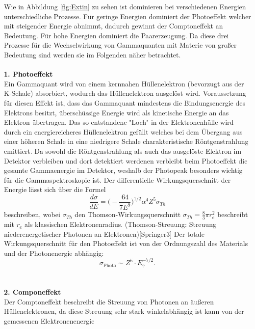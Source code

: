 Wie in Abbildung \ref{fig:Extin} zu sehen ist dominieren bei verschiedenen Energien
unterschiedliche Prozesse. Für geringe Energien dominiert der Photoeffekt welcher mit
steigender Energie abnimmt, dadurch gewinnt der Comptoneffekt an Bedeutung. Für hohe
Energien dominiert die Paarerzeugung.
Da diese drei Prozesse für die Wechselwirkung von Gammaquanten mit Materie von großer Bedeutung sind
werden sie im Folgenden näher betrachtet.
\cite{Springer3}
\\
\\
\textbf{1. Photoeffekt}\\
Ein Gammaquant wird von einem kernnahen Hüllenelektron (bevorzugt aus der K-Schale) absorbiert,
wodurch das Hüllenelektron ausgelöst wird. Voraussetzung für diesen Effekt ist, dass das Gammaquant
mindestens die Bindungsenergie des Elektrons besitzt, überschüssige Energie wird als kinetische
Energie an das Elektron übertragen.
Das so entstandene "Loch" in der Elektronenhülle wird durch ein energiereicheres Hüllenelektron
gefüllt welches bei dem Übergang aus einer höheren Schale in eine niedrigere Schale
charakteristische Röntgenstrahlung emittiert.
Da sowohl die Röntgenstrahlung als auch das ausgelöste Elektron im Detektor verbleiben und
dort detektiert werdenen verbleibt beim Photoeffekt die gesamte Gammaenergie im Detektor, weshalb
der Photopeak besonders wichtig für die Gammaspektroskopie ist.
Der differentielle Wirkungsquerschnitt der Energie lässt sich über die Formel
\begin{equation}
  \frac{d \sigma}{d E} = \bigg(-\frac{64}{7E^{9}}\bigg)^{1/2}\alpha^4 Z^5\sigma_{Th}
  \label{eqn:diffPhoto}
\end{equation}
beschreiben, wobei $\sigma_{Th}$ den Thomson-Wirkungsquerschnitt $\sigma_{Th} = \frac{8}{3}\pi r_{e}^2$
beschreibt mit $r_e$ als klassischen Elektronenradius.
(Thomson-Streuung: Streuung niederenergetischer Photonen an Elektronen)[Springer3]
Der totale Wirkungsquerschnitt für den Photoeffekt ist von der Ordnungszahl des Materials
und der Photonenergie abhängig:
\begin{equation}
  \sigma_{\text{Photo}}\sim Z^5\cdot E_{\gamma}^{-7/2}.
  \label{eqn:WQphoto}
\end{equation}
\cite{Karlsruhe}
\\
\\
\textbf{2. Componeffekt}\\
Der Comptoneffekt beschreibt die Streuung von Photonen an äußeren Hüllenelektronen, da
diese Streuung sehr stark winkelabhängig ist kann von der gemessenen Elektronenenergie
